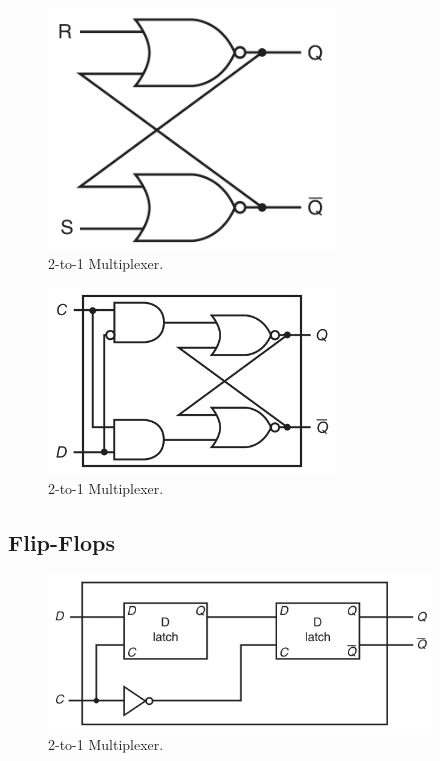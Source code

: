 \documentclass[a4paper, 11pt,oneside]{article}
\begin{document}
\begin{figure}[H]
	\begin{center}
	\includegraphics[width=3in]{latch0.png}
	\caption{2-to-1 Multiplexer.}
	\label{fig:mux} 
	\end{center}
\end{figure}

\begin{figure}[H]
	\begin{center}
	\includegraphics[width=3in]{latch1.png}
	\caption{2-to-1 Multiplexer.}
	\label{fig:mux} 
	\end{center}
\end{figure}

\subsection{Flip-Flops}

\begin{figure}[H]
	\begin{center}
	\includegraphics[width=4in]{dff0.png}
	\caption{2-to-1 Multiplexer.}
	\label{fig:mux} 
	\end{center}
\end{figure}
\end{document}
